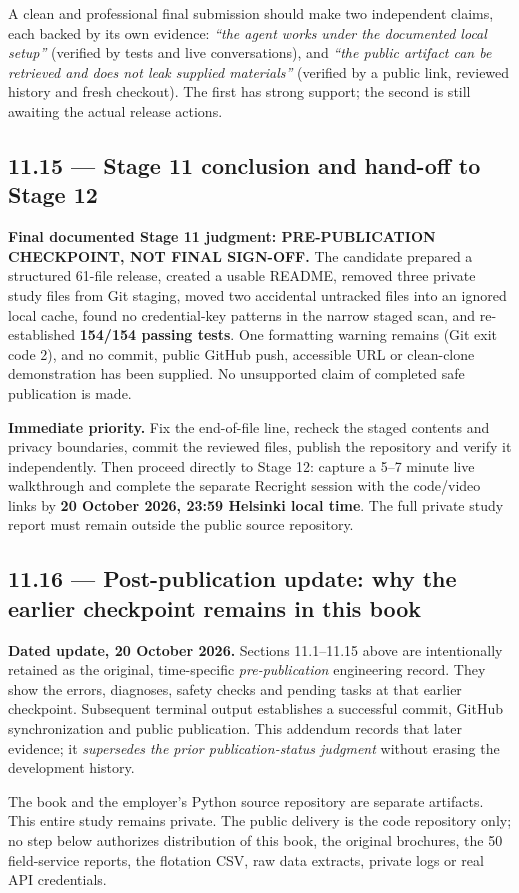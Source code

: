 \documentclass[11pt,a4paper]{article}
\DeclareRobustCommand{\code}[1]{{\ttfamily\small\detokenize{#1}}}
\begin{document}
A clean and professional final submission should make two independent claims, each backed by its own evidence: \emph{``the agent works under the documented local setup''} (verified by tests and live conversations), and \emph{``the public artifact can be retrieved and does not leak supplied materials''} (verified by a public link, reviewed history and fresh checkout). The first has strong support; the second is still awaiting the actual release actions.

\subsection{11.15 --- Stage 11 conclusion and hand-off to Stage 12}
\begin{keybox}
\textbf{Final documented Stage 11 judgment: PRE-PUBLICATION CHECKPOINT, NOT FINAL SIGN-OFF.} The candidate prepared a structured 61-file release, created a usable README, removed three private study files from Git staging, moved two accidental untracked files into an ignored local cache, found no credential-key patterns in the narrow staged scan, and re-established \textbf{154/154 passing tests}. One \code{.gitignore} formatting warning remains (Git exit code 2), and no commit, public GitHub push, accessible URL or clean-clone demonstration has been supplied. No unsupported claim of completed safe publication is made.
\end{keybox}

\textbf{Immediate priority.} Fix the \code{.gitignore} end-of-file line, recheck the staged contents and privacy boundaries, commit the reviewed files, publish the repository and verify it independently. Then proceed directly to Stage 12: capture a 5--7 minute live walkthrough and complete the separate Recright session with the code/video links by \textbf{20 October 2026, 23:59 Helsinki local time}. The full private study report must remain outside the public source repository.


\subsection{11.16 --- Post-publication update: why the earlier checkpoint remains in this book}
\begin{keybox}
\textbf{Dated update, 20 October 2026.} Sections 11.1--11.15 above are intentionally retained as the original, time-specific \emph{pre-publication} engineering record. They show the errors, diagnoses, safety checks and pending tasks at that earlier checkpoint. Subsequent terminal output establishes a successful commit, GitHub synchronization and public publication. This addendum records that later evidence; it \emph{supersedes the prior publication-status judgment} without erasing the development history.
\end{keybox}
The book and the employer's Python source repository are separate artifacts. This entire study remains private. The public delivery is the code repository only; no step below authorizes distribution of this book, the original brochures, the 50 field-service reports, the flotation CSV, raw data extracts, private logs or real API credentials.
\end{document}
